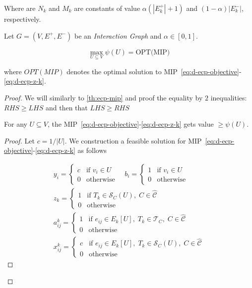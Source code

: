 Where are $N_k$ and $M_k$ are constants of value $\alpha (|E_k^{+}| + 1)$ and $(1 -
	\alpha ) |E^{-}_k|$, respectively.

\begin{theorem}
	\label{th:d-ecp-mip}
	Let $G = (V, E^{+}, E^{-})$ be an \emph{Interaction Graph} and $\alpha \in
		[0, 1]$.

	\begin{equation}
		\max_{U \subseteq V} \psi(U) = \text{OPT(MIP)}
	\end{equation}

	where $OPT(MIP)$ denotes the optimal solution to
	MIP~\ref{eq:d-ecp-objective}-\ref{eq:d-ecp-z-k}.
\end{theorem}

\begin{proof}
	We will similarly to \autoref{th:ecp-mip} and proof the equality by $2$
	inequalities: $RHS \geq LHS$ and then that $LHS \geq RHS$

	\begin{claim}
		For any $U \subseteq V$, the
		MIP~\ref{eq:d-ecp-objective}-\ref{eq:d-ecp-z-k} gets value $\geq \psi(U)$.
	\end{claim}

	\begin{proof}
		Let $c = 1 / |U|$. We construction a feasible solution for
		MIP~\ref{eq:d-ecp-objective}-\ref{eq:d-ecp-z-k} as follows

		\begin{gather}
			\label{eq:ecpp-y}
			y_i = \begin{cases}
				c & \text{if } v_{i} \in U \\
				0 & \text{otherwise}
			\end{cases} \quad
			b_i = \begin{cases}
				1 & \text{if } v_{i} \in U \\
				0 & \text{otherwise}
			\end{cases} \\
			\label{eq:ecpp-z}
			z_k = \begin{cases}
				1 & \text{if } T_{k} \in \mathcal{S}_C(U), \; C \in \mathcal{\hat{C}} \\
				0 & \text{otherwise}
			\end{cases} \\
			\label{eq:ecpp-x}
			a_{ij}^{k} = \begin{cases}
				1 & \text{if } e_{ij} \in E_{k}[U], \; T_{k} \in \mathcal{T} _C, \; C \in
				\mathcal{\hat{C}}                                                         \\
				0 & \text{otherwise}
			\end{cases} \\
			x_{ij}^{k} = \begin{cases}
				c & \text{if } e_{ij} \in E_{k}[U], \; T_{k} \in \mathcal{S}_C(U), \; C \in
				\mathcal{\hat{C}}                                                           \\
				0 & \text{otherwise}
			\end{cases}
		\end{gather}


\end{proof}
\end{proof}
